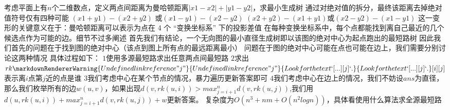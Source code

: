 {}
\markdownRendererSectionEnd \markdownRendererSectionBegin
{}\markdownRendererInterblockSeparator
{}考虑平面上有$ n $个二维数点，定义两点间距离为曼哈顿距离$ |x1-x2|+|y1-y2| $，求最小生成树\markdownRendererParagraphSeparator
{}通过对绝对值的拆分，最终该距离去掉绝对值符号仅有四种可能\markdownRendererParagraphSeparator
{}$ (x1+y1)-(x2+y2) $ 或$ (x1-y1)-(x2-y2) $\markdownRendererParagraphSeparator
{}$ (x2+y2)-(x1+y1) $或$ (x2-y2)-(x1-y1) $\markdownRendererParagraphSeparator
{}这一变形的关键意义在于：曼哈顿距离可以表示为点在 4 个 “变换坐标系” 下的投影差值\markdownRendererParagraphSeparator
{}在每种变换坐标系中，每个点都能找到离自己最近的几个候选点作为可能的边。细节不过多阐述\markdownRendererInterblockSeparator
{}\markdownRendererInterblockSeparator
{}
\markdownRendererSectionEnd \markdownRendererSectionBegin
{}\markdownRendererInterblockSeparator
{}首先我们有结论，一个无向图的最小直径生成树即以该图的绝对中心为起点跑出的最短路树\markdownRendererParagraphSeparator
{}因此我们首先的问题在于找到图的绝对中心（该点到图上所有点的最远距离最小）\markdownRendererParagraphSeparator
{}问题在于图的绝对中心可能在点也可能在边上，我们需要分别讨论这两种情况\markdownRendererParagraphSeparator
{}具体过程如下：\markdownRendererParagraphSeparator
{}$ 1 $使用多源最短路求出任意两点间最短路\markdownRendererParagraphSeparator
{}$ 2 $求出$ rk\markdownRendererWarning{Undefined link reference "j"}{Undefined link reference "j"}{Look for the text `[...][j]`.}{Look for the text `[...][j]`.}[i][j] $表示离$ i $点第$ j $近的点是谁\markdownRendererParagraphSeparator
{}$ 3 $我们考虑中心在某个节点的情况，暴力遍历更新答案即可\markdownRendererParagraphSeparator
{}$ 4 $我们考虑中心在边上的情况，我们不妨设$ ans $为直径，那么我们枚举所有的边$ w(u,v) $，如果出现$ d(v,rk(u,i))>max_{j=i+1}^{n}d(v,rk(u,j)) $,我们用$ d(u,rk(u,i))+max_{j=i+1}^{n}d(v,rk(u,j))+w $更新答案。\markdownRendererParagraphSeparator
{}复杂度为$ O(n^3+nm+O(n^2logn)) $，具体看使用什么算法求全源最短路\markdownRendererInterblockSeparator
{}\markdownRendererInterblockSeparator
